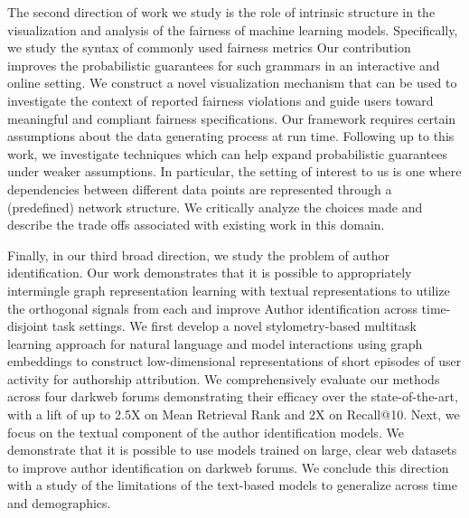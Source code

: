 The second direction of work we study is the role of intrinsic structure in the visualization and analysis of the fairness of machine learning models.
Specifically, we study the syntax of commonly used fairness metrics 
Our contribution improves the probabilistic guarantees for such grammars in an interactive and online setting.
We construct a novel visualization mechanism that can be used to investigate the context of reported fairness violations and guide users toward meaningful and compliant fairness specifications.
Our framework requires certain assumptions about the data generating process at run time.
Following up to this work, we investigate techniques which can help expand probabilistic guarantees under weaker assumptions.
In particular, the setting of interest to us is one where dependencies between different data points are represented through a (predefined) network structure. We critically analyze the choices made and describe the trade offs associated with existing work in this domain.

Finally, in our third broad direction, we study the problem of author identification.
Our work demonstrates that it is possible to appropriately intermingle graph representation learning with textual representations to utilize the orthogonal signals from each and improve Author identification across time-disjoint task settings.
We first develop a novel stylometry-based multitask learning approach for natural language and model interactions using graph embeddings to construct low-dimensional representations of short episodes of user activity for authorship attribution. 
We comprehensively evaluate our methods across four darkweb forums demonstrating their efficacy over the state-of-the-art, with a lift of up to 2.5X on Mean Retrieval Rank and 2X on Recall@10.
Next, we focus on the textual component of the author identification models.
We demonstrate that it is possible to use models trained on large, clear web datasets to improve author identification on darkweb forums.
We conclude this direction with a study of the limitations of the text-based models to generalize across time and demographics.




